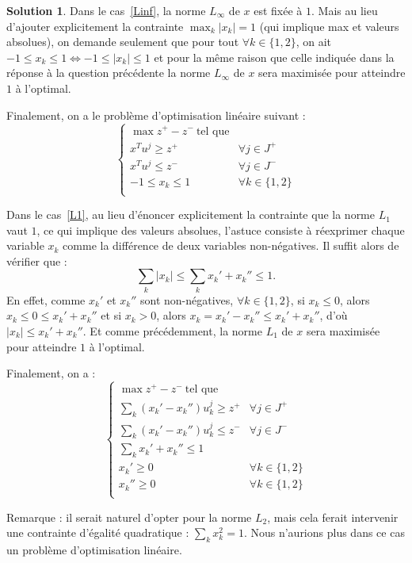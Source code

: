 \documentclass[a4paper,francais]{article}
\theoremstyle{definition}
\newtheorem*{solution}{Solution}
\begin{document}
\begin{solution}
  Dans le cas~\ref{Linf}, la norme $L_\infty$ de $x$ est fixée à $1$.
  Mais au lieu d'ajouter explicitement la contrainte $\max_k |x_k| = 1$
  (qui implique max et valeurs absolues),
  on demande seulement que pour tout $\forall k \in \{1, 2\}$, on ait
  $-1 \leq x_k \leq 1 \Leftrightarrow -1 \leq |x_k| \leq 1$ et pour la même
  raison que celle indiquée dans la réponse à la question précédente
  la norme $L_\infty$ de $x$ sera maximisée pour atteindre $1$ à l'optimal.
  
  Finalement, on a le problème d'optimisation linéaire suivant :  
  \[
  \left\{
  \begin{array}{ll}
    \max z^+ - z^- \ \text{tel que} & \\
    x^T u^j \geq z^+ & \forall j \in J^+ \\ 
    x^T u^j \leq z^- & \forall j \in J^- \\
    -1 \leq x_k \leq 1 & \forall k \in \{1, 2\} \\
  \end{array}
  \right.
  \]

  Dans le cas~\ref{L1}, au lieu d'énoncer explicitement la contrainte
  que la norme $L_1$ vaut $1$, ce qui implique des valeurs absolues, l'astuce consiste
  à réexprimer chaque variable $x_k$ comme la différence de deux variables non-négatives.
  Il suffit alors de vérifier que :
  \[ \sum_k |x_k| \leq \sum_k x_k' + x_k'' \leq 1. \]
  En effet, comme $x_k'$ et $x_k''$ sont non-négatives, $\forall k \in \{1, 2\}$,
  si $x_k \leq 0$, alors $x_k \leq 0 \leq x_k' + x_k''$
  et si $x_k > 0$, alors $x_k = x_k' - x_k'' \leq x_k' + x_k''$,
  d'où $|x_k| \leq x_k' + x_k''$.
  Et comme précédemment, la norme $L_1$ de $x$ sera maximisée pour atteindre $1$ à l'optimal.
  
  Finalement, on a : 
  \[
  \left\{
  \begin{array}{ll}
    \max z^+ - z^- \ \text{tel que} & \\
    \sum_k (x_k' - x_k'') u_k^j \geq z^+ & \forall j \in J^+ \\ 
    \sum_k (x_k' - x_k'') u_k^j \leq z^- & \forall j \in J^- \\
    \sum_k x_k' + x_k'' \leq 1 \\
    x_k' \geq 0 & \forall k \in \{1, 2\} \\
    x_k'' \geq 0 & \forall k \in \{1, 2\} \\
  \end{array}
  \right.
  \]
  
  Remarque : il serait naturel d'opter pour la norme $L_2$, mais cela ferait intervenir
  une contrainte d'égalité quadratique : $\sum_k x_k^2 = 1$. Nous n'aurions plus dans
  ce cas un problème d'optimisation linéaire. 
\end{solution}
\end{document}
